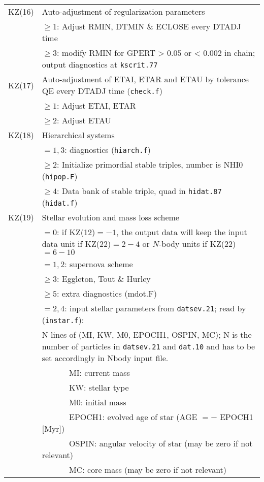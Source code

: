 \begin{longtable}{@{}p{1.5cm}p{13.0cm}}
KZ(16)  & Auto-adjustment of regularization parameters \\
        & $\ge 1$: Adjust RMIN, DTMIN \& ECLOSE every DTADJ time \\
        & $\ge 3$: modify RMIN for GPERT > $0.05$ or < $0.002$ in chain; output diagnostics at \texttt{kscrit.77} \\
KZ(17)  & Auto-adjustment of ETAI, ETAR and ETAU by tolerance QE every DTADJ time (\texttt{check.f}) \\
        & $\ge 1$: Adjust ETAI, ETAR \\
        & $\ge 2$: Adjust ETAU \\
KZ(18)  & Hierarchical systems \\
        & $=1,3$: diagnostics (\texttt{hiarch.f})\\
        & $\ge 2$: Initialize primordial stable triples, number is NHI0 (\texttt{hipop.F}) \\
        & $\ge 4$: Data bank of stable triple, quad in \texttt{hidat.87} (\texttt{hidat.f}) \\
KZ(19)  & Stellar evolution and mass loss scheme \\
        & $=0$: if KZ(12)$=-1$, the output data will keep the input data unit if KZ(22)$=2-4$ or $N$-body units if KZ(22)$=6-10$\\
        & $=1,2$: supernova scheme \\
        & $\ge 3$: Eggleton, Tout \& Hurley \\
        & $\ge 5$: extra diagnostics ({mdot.F}) \\
        & $=2,4$: input stellar parameters from \texttt{datsev.21}; 
                  read by (\texttt{instar.f}): \\
                & N lines of (MI, KW, M0, EPOCH1, OSPIN, MC); N is the number of particles in \texttt{datsev.21} and \texttt{dat.10} and has to be set accordingly in Nbody input file. \\
                & ~~~~~~   MI: current mass \\
                & ~~~~~~   KW: stellar type \\
                & ~~~~~~   M0: initial mass \\
                & ~~~~~~   EPOCH1: evolved age of star (AGE $= -$ EPOCH1 [Myr]) \\
                & ~~~~~~   OSPIN: angular velocity of star (may be zero if not relevant) \\
                & ~~~~~~   MC: core mass (may be zero if not relevant) \\

\end{longtable}
